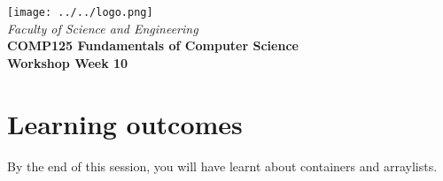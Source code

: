 \usepackage[T1]{fontenc}
\usepackage{pslatex}
 \usepackage[pdftex]{color}  
 \usepackage[pdftex]{graphicx}     
\usepackage{verbatim}
\usepackage{xcolor}
\usepackage{paralist}
\usepackage{tagging}

\usepackage[colorlinks=true,urlcolor=red]{hyperref}
\setlength{\topmargin}{-0.5in}                  %
\setlength{\textheight}{9.5in}                  %
\setlength{\oddsidemargin}{0in}                 %
\setlength{\evensidemargin}{0in}                %
\setlength{\textwidth}{6.5in}                   %
\setlength{\parindent}{0.0in}
\newcommand{\code}{\texttt}

\usepackage{listings}




%
\vspace{0.2in}
\begin{center}
        {\large  %
\texttt{[image: ../../logo.png]}\\
\medskip
        {\it  Faculty of Science and Engineering\\}
        \vspace{0.2in}
         {\bf COMP125 Fundamentals of Computer Science\\
        Workshop Week 10\\}}
\end{center}
\vspace{0.3in}
%

\renewcommand{\labelenumi}{\alph{enumi}.}
 
\section* {Learning outcomes}

By the end of this session, you will have learnt about containers and arraylists. 

